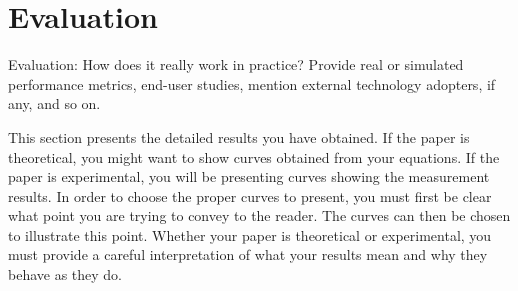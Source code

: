 \section{Evaluation}\label{sec:evaluation} 


Evaluation: How does it really work in practice? Provide real or simulated
performance metrics, end-user studies, mention external technology adopters,
if any, and so on.

This section presents the detailed results you have obtained. If the paper
is theoretical, you might want to show curves obtained from your equations.
If the paper is experimental, you will be presenting curves showing the
measurement results. In order to choose the proper curves to present, you
must first be clear what point you are trying to convey to the reader. The 
curves can then be chosen to illustrate this point. Whether your paper is
theoretical or experimental, you must provide a careful interpretation of
what your results mean and why they behave as they do.
